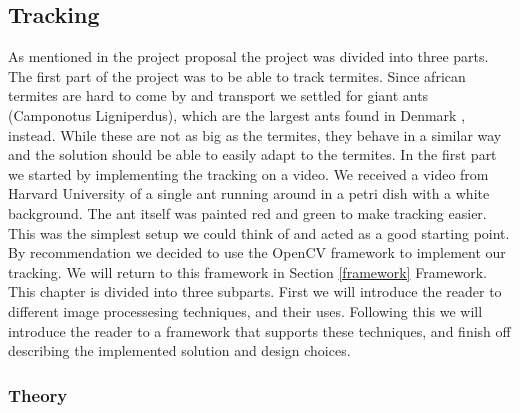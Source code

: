 
\subsection{Tracking}
\label{tracking}
As mentioned in the project proposal the project was divided into three parts. The first part of the project was to be able to track termites. Since african termites are hard to come by and transport we settled for giant ants (Camponotus Ligniperdus), which are the largest ants found in Denmark \cite{fogn}, instead. While these are not as big as the termites, they behave in a similar way and the solution should be able to easily adapt to the termites. In the first part we started by implementing the tracking on a video. We received a video from Harvard University of a single ant running around in a petri dish with a white background. The ant itself was painted red and green to make tracking easier. This was the simplest setup we could think of and acted as a good starting point. By recommendation we decided to use the OpenCV \cite{opencv} framework to implement our tracking. We will return to this framework in Section \ref{framework} Framework. \\

This chapter is divided into three subparts. First we will introduce the reader to different image processesing techniques, and their uses. Following this we will introduce the reader to a framework that supports these techniques, and finish off describing the implemented solution and design choices.

% 
% 

\subsubsection{Theory} \mbox{}\par


